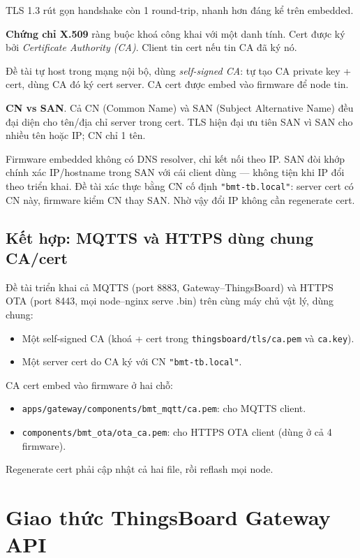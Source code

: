 TLS 1.3 rút gọn handshake còn 1 round-trip, nhanh hơn đáng kể trên embedded.

\textbf{Chứng chỉ X.509} ràng buộc khoá công khai với một danh tính. Cert được ký bởi \textit{Certificate Authority (CA)}. Client tin cert nếu tin CA đã ký nó.

Đề tài tự host trong mạng nội bộ, dùng \textit{self-signed CA}: tự tạo CA private key + cert, dùng CA đó ký cert server. CA cert được embed vào firmware để node tin.

\textbf{CN vs SAN}. Cả CN (Common Name) và SAN (Subject Alternative Name) đều đại diện cho tên/địa chỉ server trong cert. TLS hiện đại ưu tiên SAN vì SAN cho nhiều tên hoặc IP; CN chỉ 1 tên.

Firmware embedded không có DNS resolver, chỉ kết nối theo IP. SAN đòi khớp chính xác IP/hostname trong SAN với cái client dùng --- không tiện khi IP đổi theo triển khai. Đề tài xác thực bằng CN cố định \texttt{"bmt-tb.local"}: server cert có CN này, firmware kiểm CN thay SAN. Nhờ vậy đổi IP không cần regenerate cert.

\subsection{Kết hợp: MQTTS và HTTPS dùng chung CA/cert}

Đề tài triển khai cả MQTTS (port 8883, Gateway--ThingsBoard) và HTTPS OTA (port 8443, mọi node--nginx serve .bin) trên cùng máy chủ vật lý, dùng chung:

\begin{itemize}
    \item Một self-signed CA (khoá + cert trong \texttt{thingsboard/tls/ca.pem} và \texttt{ca.key}).
    \item Một server cert do CA ký với CN \texttt{"bmt-tb.local"}.
\end{itemize}

CA cert embed vào firmware ở hai chỗ:

\begin{itemize}
    \item \texttt{apps/gateway/components/bmt\_mqtt/ca.pem}: cho MQTTS client.
    \item \texttt{components/bmt\_ota/ota\_ca.pem}: cho HTTPS OTA client (dùng ở cả 4 firmware).
\end{itemize}

Regenerate cert phải cập nhật cả hai file, rồi reflash mọi node.

\section{Giao thức ThingsBoard Gateway API}

